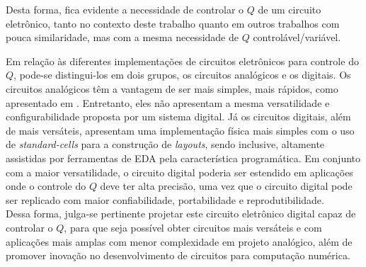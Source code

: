 

Desta forma, fica evidente a necessidade de controlar o $Q$ de um circuito eletrônico, tanto no contexto deste trabalho quanto em outros trabalhos com pouca similaridade, mas com a mesma necessidade de $Q$ controlável/variável. 


Em relação às diferentes implementações de circuitos eletrônicos para controle do $Q$, pode-se distingui-los em dois grupos, os circuitos analógicos e os digitais. Os circuitos analógicos têm a vantagem de ser mais simples, mais rápidos, como apresentado em \cite{z-match-q-2}. Entretanto, eles não apresentam a mesma versatilidade e configurabilidade proposta por um sistema digital. Já os circuitos digitais, além de mais versáteis, apresentam uma implementação física mais simples com o uso de \textit{standard-cells} para a construção de \textit{layouts}, sendo inclusive, altamente assistidas por ferramentas de EDA pela característica programática. Em conjunto com a maior versatilidade, o circuito digital poderia ser estendido em aplicações onde o controle do $Q$ deve ter alta precisão, uma vez que o circuito digital pode ser replicado com maior confiabilidade, portabilidade e reprodutibilidade. \\





Dessa forma, julga-se pertinente projetar este circuito eletrônico digital capaz de controlar o $Q$, para que seja possível obter circuitos mais versáteis e com aplicações mais amplas com menor complexidade em projeto analógico, além de promover inovação no desenvolvimento de circuitos para computação numérica.





